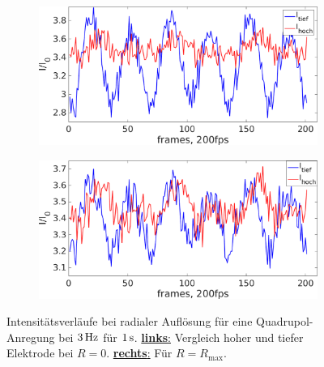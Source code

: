 \documentclass[numbers=noenddot,a4paper]{scrartcl}
\newcommand{\ix}[1]{_\text{#1}}
\newcommand{\fett}[1]{\textbf{#1}}
\begin{document}
						\begin{figure}[!b]
							\centering
							\begin{subfigure}{0.49\textwidth}
								\centering
								\includegraphics[width=\textwidth,height=0.6\textwidth]{figs/auswertung/intenshochutiefquadin3Hz1sek.png}
							\end{subfigure}
							\begin{subfigure}{0.49\textwidth}
								\centering
								\includegraphics[width=\textwidth,height=0.6\textwidth]{figs/auswertung/intenshochutiefquadout3Hz1sek.png}
							\end{subfigure}
							\caption{Intensitätsverläufe bei radialer Auflösung für eine Quadrupol-Anregung bei $\unit[3]{Hz}$ für $\unit[1]{s}$. \underline{\fett{links}:} Vergleich hoher und tiefer Elektrode bei $R=0$. \underline{\fett{rechts}:} Für $R=R\ix{max}$.}\label{img:intensquadhochutiefrad}
						\end{figure}
\end{document}

